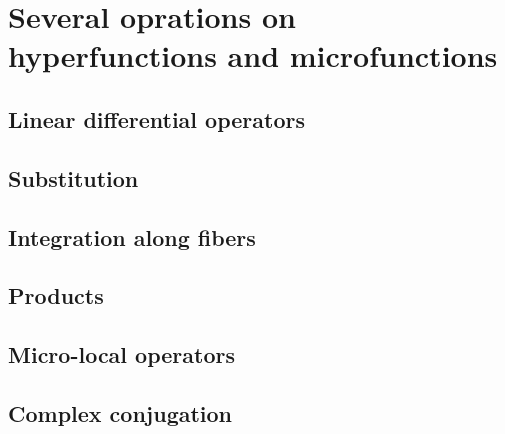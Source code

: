 \section{Several oprations on hyperfunctions and microfunctions}

\subsection{Linear differential operators}

\subsection{Substitution}

\subsection{Integration along fibers}

\subsection{Products}

\subsection{Micro-local operators}

\subsection{Complex conjugation}